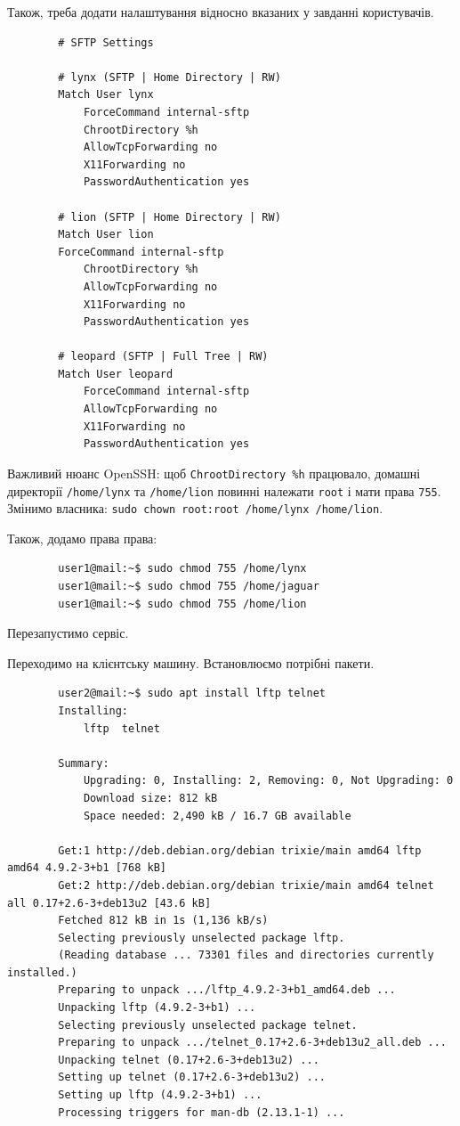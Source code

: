 \documentclass[14pt, a4paper]{extreport}
\begin{document}
	Також, треба додати налаштування відносно вказаних у завданні користувачів.
	
	\begin{verbatim}
		# SFTP Settings
		
		# lynx (SFTP | Home Directory | RW)
		Match User lynx
			ForceCommand internal-sftp
			ChrootDirectory %h
			AllowTcpForwarding no
			X11Forwarding no
			PasswordAuthentication yes
		
		# lion (SFTP | Home Directory | RW)
		Match User lion
		ForceCommand internal-sftp
			ChrootDirectory %h
			AllowTcpForwarding no
			X11Forwarding no
			PasswordAuthentication yes
		
		# leopard (SFTP | Full Tree | RW)
		Match User leopard
			ForceCommand internal-sftp
			AllowTcpForwarding no
			X11Forwarding no
			PasswordAuthentication yes
	\end{verbatim}
	
	Важливий нюанс OpenSSH: щоб \texttt{ChrootDirectory \%h} працювало, домашні директорії \texttt{/home/lynx} та \texttt{/home/lion} повинні належати \texttt{root} і мати права \texttt{755}. Змінимо власника: \texttt{sudo chown root:root /home/lynx /home/lion}.
	
	Також, додамо права права:
	
	\begin{verbatim}
		user1@mail:~$ sudo chmod 755 /home/lynx
		user1@mail:~$ sudo chmod 755 /home/jaguar
		user1@mail:~$ sudo chmod 755 /home/lion
	\end{verbatim}
	
	Перезапустимо сервіс.
	
	
	Переходимо на клієнтську машину. Встановлюємо потрібні пакети. \sideat{[VM 2]}
	
	\begin{verbatim}
		user2@mail:~$ sudo apt install lftp telnet
		Installing:                     
			lftp  telnet
		
		Summary:
			Upgrading: 0, Installing: 2, Removing: 0, Not Upgrading: 0
			Download size: 812 kB
			Space needed: 2,490 kB / 16.7 GB available
		
		Get:1 http://deb.debian.org/debian trixie/main amd64 lftp amd64 4.9.2-3+b1 [768 kB]
		Get:2 http://deb.debian.org/debian trixie/main amd64 telnet all 0.17+2.6-3+deb13u2 [43.6 kB]
		Fetched 812 kB in 1s (1,136 kB/s) 
		Selecting previously unselected package lftp.
		(Reading database ... 73301 files and directories currently installed.)
		Preparing to unpack .../lftp_4.9.2-3+b1_amd64.deb ...
		Unpacking lftp (4.9.2-3+b1) ...
		Selecting previously unselected package telnet.
		Preparing to unpack .../telnet_0.17+2.6-3+deb13u2_all.deb ...
		Unpacking telnet (0.17+2.6-3+deb13u2) ...
		Setting up telnet (0.17+2.6-3+deb13u2) ...
		Setting up lftp (4.9.2-3+b1) ...
		Processing triggers for man-db (2.13.1-1) ...
	\end{verbatim}
	
\end{document}
